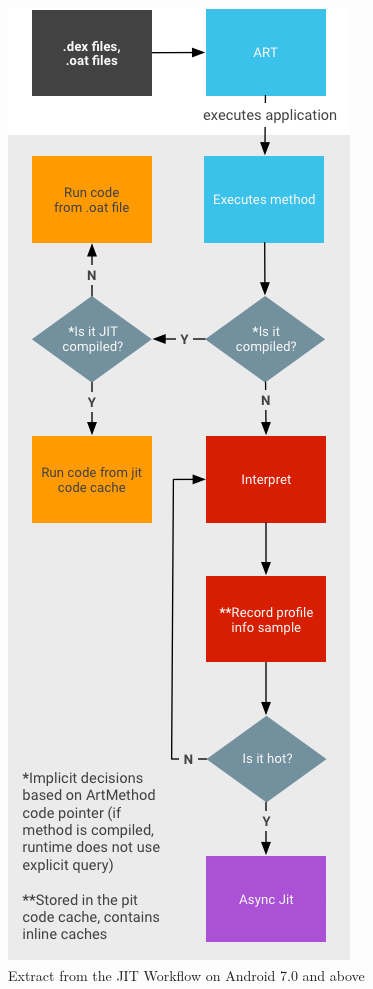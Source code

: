 \begin{figure}[H]
	\begin{center}
		\includegraphics[scale=0.45]{figures/jit-workflow-extract.png}
	\end{center}
	\caption{Extract from the JIT Workflow on Android 7.0 and above \cite{JitWorkFlow}}
	\label{JitWorkflow}
\end{figure}

